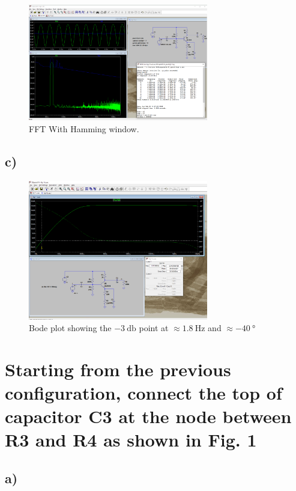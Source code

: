 \documentclass{article}
\begin{document}
	\begin{figure}[H]
	    \centering
	    \includegraphics[width=0.7\textwidth]{1b}
	    \caption{FFT With Hamming window.}
	\end{figure}
	
	\subsection*{c)}

	\begin{figure}[H]
	    \centering
	    \includegraphics[width=0.7\textwidth]{1c}
	    \caption{Bode plot showing the $\SI{-3}{\decibel}$ point at $\approx \SI{1.8}{\hertz}$ and $\approx \SI{-40}{\degree}$}
	\end{figure}


	\section{Starting from the previous configuration, connect the top of capacitor C3 at the node between R3 and R4 as shown in Fig. 1}
	
	\subsection*{a)}
\end{document}
